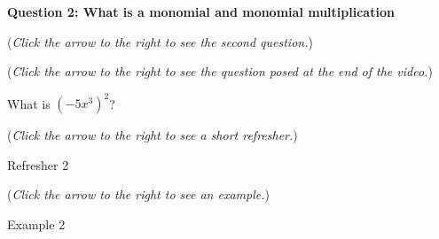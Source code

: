 \documentclass{ximera}
\begin{document}
\textbf{Question 2: What is a monomial and monomial multiplication}
\begin{question}
\begin{flushright}
{\color{blue}(\emph{Click the arrow to the right to see the second question.})}
\end{flushright}
\begin{center}
\begin{expandable}
\begin{flushright}
{\color{blue}(\emph{Click the arrow to the right to see the  question
posed at the end of the video.})}
\end{flushright}
\begin{expandable}
What is $(-5x^3)^2$?
\begin{multipleChoice}
\end{multipleChoice}
\begin{flushright}
{\color{blue}(\emph{Click the arrow to the right to see a short refresher.})}
\end{flushright}
\begin{expandable}
\begin{center}
Refresher 2
\end{center}
\end{expandable}
\begin{flushright}
{\color{blue}(\emph{Click the arrow to the right to see an example.})}
\end{flushright}
\begin{expandable}
\begin{center}
Example 2
\end{center}
\end{expandable}
\end{expandable}
\end{expandable}
\end{center}
\end{question}
\end{document}
